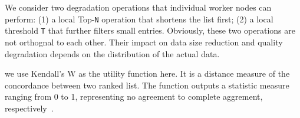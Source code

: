 We consider two degradation operations that individual worker nodes can perform:
(1) a local Top-\texttt{N} operation that shortens the list first; (2) a local
threshold \texttt{T} that further filters small entries. Obviously, these two
operations are not orthognal to each other. Their impact on data size reduction
and quality degradation depends on the distribution of the actual data.

we use Kendall's W as the utility function here. It is a distance measure of the
concordance between two ranked list. The function outputs a statistic measure
ranging from 0 to 1, representing no agreement to complete aggrement,
respectively~\cite{abdi2007kendall}.

